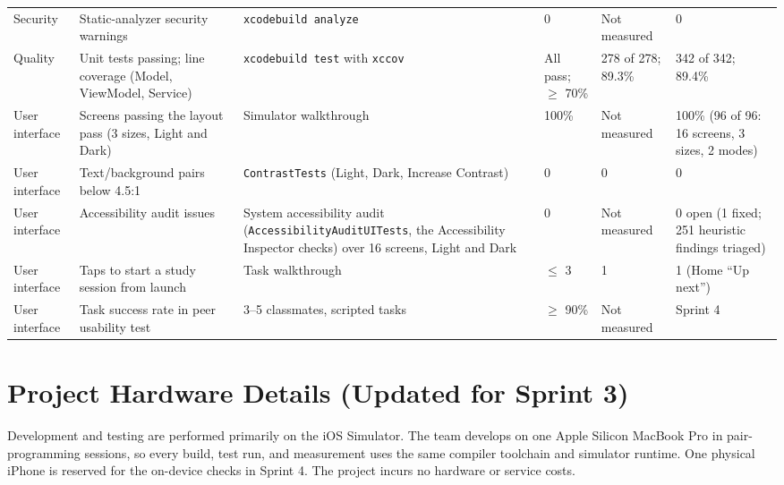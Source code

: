 \documentclass[12pt,letterpaper]{article}
\begin{document}
\begin{xltabular}{\textwidth}{@{}L{1.8cm} L{3.0cm} Y L{1.6cm} L{1.9cm} L{2.1cm}@{}}
Security & Static-analyzer security warnings & \texttt{xcodebuild analyze} & 0 & Not measured & 0 \\
Quality & Unit tests passing; line coverage (Model, ViewModel, Service) & \texttt{xcodebuild test} with \texttt{xccov} & All pass; $\ge$ 70\% & 278 of 278; 89.3\% & 342 of 342; 89.4\% \\
User interface & Screens passing the layout pass (3 sizes, Light and Dark) & Simulator walkthrough & 100\% & Not measured & 100\% (96 of 96: 16 screens, 3 sizes, 2 modes) \\
User interface & Text/background pairs below 4.5:1 & \texttt{ContrastTests} (Light, Dark, Increase Contrast) & 0 & 0 & 0 \\
User interface & Accessibility audit issues & System accessibility audit (\texttt{AccessibilityAuditUITests}, the Accessibility Inspector checks) over 16 screens, Light and Dark & 0 & Not measured & 0 open (1 fixed; 251 heuristic findings triaged) \\
User interface & Taps to start a study session from launch & Task walkthrough & $\le$ 3 & 1 & 1 (Home ``Up next'') \\
User interface & Task success rate in peer usability test & 3--5 classmates, scripted tasks & $\ge$ 90\% & Not measured & Sprint 4 \\
\end{xltabular}

\section{Project Hardware Details (Updated for Sprint 3)}
Development and testing are performed primarily on the iOS Simulator. The team
develops on one Apple Silicon MacBook Pro in pair-programming sessions, so every
build, test run, and measurement uses the same compiler toolchain and simulator
runtime. One physical iPhone is reserved for the on-device checks in Sprint 4. The
project incurs no hardware or service costs.
\end{document}
